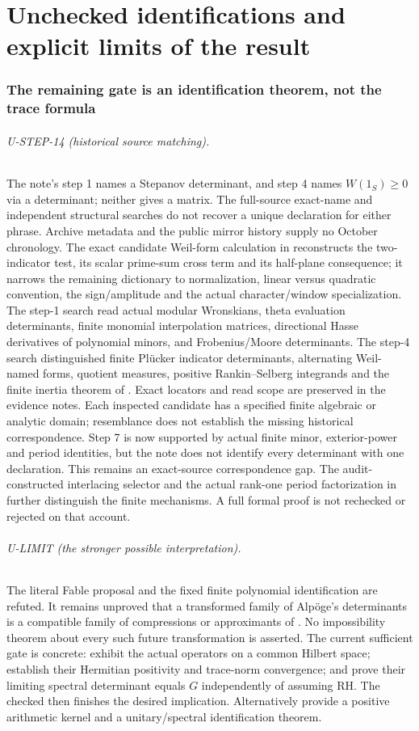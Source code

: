 \part{Unchecked identifications and explicit limits of the result}
\section{The remaining gate is an identification theorem, not the trace formula}
\paragraph{U-STEP-14 (historical source matching).}
The note's step 1 names a Stepanov determinant, and step 4 names $W(1_S)\ge0$ via a determinant; neither gives a matrix. The full-source exact-name and independent structural searches do not recover a unique declaration for either phrase. Archive metadata and the public mirror history supply no October chronology. The exact candidate Weil-form calculation in  reconstructs the two-indicator test, its scalar prime-sum cross term and its half-plane consequence; it narrows the remaining dictionary to normalization, linear versus quadratic convention, the sign/amplitude and the actual character/window specialization. The step-1 search read actual modular Wronskians, theta evaluation determinants, finite monomial interpolation matrices, directional Hasse derivatives of polynomial minors, and Frobenius/Moore determinants. The step-4 search distinguished finite Pl\"ucker indicator determinants, alternating Weil-named forms, quotient measures, positive Rankin--Selberg integrands and the finite inertia theorem of . Exact locators and read scope are preserved in the evidence notes. Each inspected candidate has a specified finite algebraic or analytic domain; resemblance does not establish the missing historical correspondence. Step 7 is now supported by actual finite minor, exterior-power and period identities, but the note does not identify every determinant with one declaration. This remains an exact-source correspondence gap. The audit-constructed interlacing selector and the actual rank-one period factorization in  further distinguish the finite mechanisms. A full formal proof is not rechecked or rejected on that account.

\paragraph{U-LIMIT (the stronger possible interpretation).}
The literal Fable proposal and the fixed finite polynomial identification are refuted. It remains unproved that a transformed family of Alp\"oge's determinants is a compatible family of compressions or approximants of . No impossibility theorem about every such future transformation is asserted. The current sufficient gate is concrete: exhibit the actual operators on a common Hilbert space; establish their Hermitian positivity and trace-norm convergence; and prove their limiting spectral determinant equals $G$ independently of assuming RH. The checked  then finishes the desired implication. Alternatively provide a positive arithmetic kernel and a unitary/spectral identification theorem.

